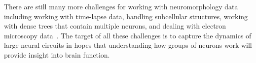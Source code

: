 There are still many more challenges for working with
neuromorphology data including working with time-lapse data,
handling subcellular structures, working with dense trees that contain
multiple neurons, and dealing with electron microscopy
data~\autocite{DIADEM&Beyond:Liu:2011}. The target of all these
challenges is to capture the dynamics of large neural circuits in
hopes that understanding how groups of neurons work will provide
insight into brain function.

